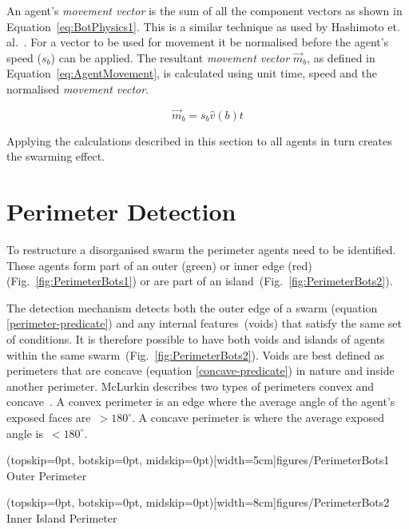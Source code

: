 \documentclass{ieeeaccess}
\begin{document}
An agent's \textit{movement vector} is the sum of all the component vectors as
shown in Equation~\ref{eq:BotPhysics1}. This is a similar technique as used by
Hashimoto et. al.~\cite{HAY:08}. For a vector to be used for movement it be
normalised before the agent's speed ($s_b$)  can be applied. The resultant
\textit{movement vector} $\vec m_b$, as defined in Equation~\ref{eq:AgentMovement}, is calculated using unit time, speed and the normalised \textit{movement vector}.

\begin{equation}\label{eq:AgentMovement}
\vec m_b = s_b  \hat v(b)  t
\end{equation}

Applying the calculations described in this section to all agents in turn creates the swarming effect. 
  
\section{Perimeter Detection}\label{sec:PerimeterDetection}
To restructure a disorganised swarm the perimeter agents need to be identified. These agents form part of an outer ({\color{green}green}) or inner edge ({\color{red}red}) (Fig.~\ref{fig:PerimeterBots1}) or are part of an island~(Fig.~\ref{fig:PerimeterBots2}).

The detection mechanism detects both the outer edge of a swarm (equation
\ref{perimeter-predicate})  and any internal features~(voids) that satisfy the same
set of conditions. It is therefore possible to have both voids and islands of
agents within the same swarm~(Fig.~\ref{fig:PerimeterBots2}). Voids are best
defined as perimeters that are concave (equation \ref{concave-predicate}) in nature and inside another perimeter. McLurkin describes two types of perimeters convex and concave~\cite{MD:09}. A convex perimeter is an edge where the average angle of the agent's exposed faces are~$> 180^\circ$. A concave perimeter is where the average exposed angle is~$< 180^\circ$.

\Figure[t!](topskip=0pt, botskip=0pt, midskip=0pt)[width=5cm]{figures/PerimeterBots1}
{Outer Perimeter\label{fig:PerimeterBots1}}

\Figure[t!](topskip=0pt, botskip=0pt, midskip=0pt)[width=8cm]{figures/PerimeterBots2}
{Inner Island Perimeter\label{fig:PerimeterBots2}}
\end{document}

